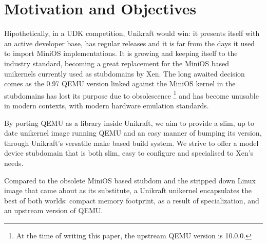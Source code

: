 \chapter{Motivation and Objectives}
\label{chapter:motivation-objectives}

Hipothetically, in a UDK competition, Unikraft would win: it presents itself with an active developer base, has regular releases and it is far from the days it used to import MiniOS implementations.
It is growing and keeping itself to the industry standard, becoming a great replacement for the MiniOS based unikernels currently used as stubdomains by Xen.
The long awaited decision comes as the 0.97 QEMU version linked against the MiniOS kernel in the stubdomains has lost its purpose due to obsolescence \footnote{At the time of writing this paper, the upstream QEMU version is 10.0.0.} and has become unusable in modern contexts, with modern hardware emulation standards.

By porting QEMU as a library inside Unikraft, we aim to provide a slim, up to date unikernel image running QEMU and an easy manner of bumping its version, through Unikraft's versatile make based build system.
We strive to offer a model device stubdomain that is both slim, easy to configure and specialised to Xen's needs.

Compared to the obsolete MiniOS based stubdom and the stripped down Linux image that came about as its substitute, a Unikraft unikernel encapsulates the best of both worlds: compact memory footprint, as a result of specialization, and an upstream version of QEMU.
